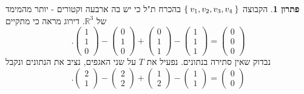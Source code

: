 \documentclass[12pt]{report}
\theoremstyle{plain}
\theoremstyle{definition}
\newtheorem*{solution}{פתרון}
\newcommand{\R}{\mathbb{R}}
\newcommand{\0}{\mathbf{0}}
\begin{document}
\begin{solution}
הקבוצה 
$\Set{v_1,v_2,v_3,v_4}$
בהכרח ת"ל כי יש בה ארבעה וקטורים - יותר מהמימד של 
$\R^3$.
דירוג מראה כי מתקיים
$$
.\begin{pmatrix}1\\1\\0\end{pmatrix}-\begin{pmatrix}0\\1\\0\end{pmatrix}+\begin{pmatrix}0\\1\\1\end{pmatrix}- \begin{pmatrix}1\\1\\1\end{pmatrix}=\begin{pmatrix}0\\0\\0\end{pmatrix}
$$
נבדוק שאין סתירה בנתונים. נפעיל את 
$T$
על שני האגפים, נציב את הנתונים ונקבל
$$
.\begin{pmatrix}2\\1\end{pmatrix}-\begin{pmatrix}2\\2\end{pmatrix}+\begin{pmatrix}1\\2\end{pmatrix}-\begin{pmatrix}1\\1\end{pmatrix}=\begin{pmatrix}0\\0\end{pmatrix}
$$


\end{solution}
\end{document}

